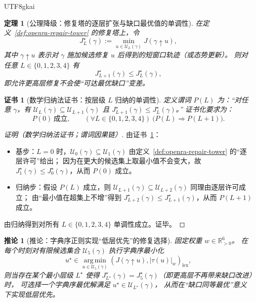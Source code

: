 \documentclass[12pt]{article}
\newtheorem{theorem}{定理}[section]
\newtheorem{corollary}{推论}[section]
\newtheorem{Certificate}{证书}[section]
\newcommand{\RR}{\mathbb{R}}
\begin{document}
\begin{CJK*}{UTF8}{gkai}
\begin{theorem}[公理降级：修复塔的逐层扩张与缺口最优值的单调性]
\label{thm:openra-repair-tower-monotone}
在定义~\ref{def:openra-repair-tower} 的修复塔上，令
\[
  J_L^\star(\gamma)
  :=
  \min_{u\in\mathcal{U}_L(\gamma)} J(\gamma\uparrow u),
\]
其中 $\gamma\uparrow u$ 表示对 $\gamma$ 施加候选修复 $u$ 后得到的短窗口轨迹（或态势更新）。
则对任意 $L\in\{0,1,2,3,4\}$ 有
\[
  J_{L+1}^\star(\gamma)\le J_L^\star(\gamma),
\]
即允许更高层修复不会使“可达最优缺口”变差。
\end{theorem}

\begin{Certificate}[数学归纳法证书：按层级 $L$ 归纳的单调性]
\label{cert:openra-repair-tower-monotone}
定义谓词 $P(L)$ 为：“对任意 $\gamma$，有 $\mathcal{U}_L(\gamma)\subseteq\mathcal{U}_{L+1}(\gamma)$ 且 $J_{L+1}^\star(\gamma)\le
  J_L^\star(\gamma)$。”
证书化要求为：
\[
  P(0)\ \text{成立},\qquad
  (\forall L\in\{0,1,2,3,4\})\ \bigl(P(L)\Rightarrow P(L+1)\bigr).
\]
\end{Certificate}

\begin{proof}[证明（数学归纳法证书；谓词因果链）]
由证书~\ref{cert:openra-repair-tower-monotone}：
\begin{itemize}
  \item 基步：$L=0$ 时，$\mathcal{U}_0(\gamma)\subseteq\mathcal{U}_1(\gamma)$ 由定义~\ref{def:openra-repair-tower} 的“逐层许可”给出；
  因为在更大的候选集上取最小值不会变大，故 $J_1^\star(\gamma)\le J_0^\star(\gamma)$，从而 $P(0)$ 成立。
  \item 归纳步：假设 $P(L)$ 成立，则 $\mathcal{U}_{L+1}(\gamma)\subseteq\mathcal{U}_{L+2}(\gamma)$ 同理由逐层许可成立；
  由“最小值在超集上不增”得到 $J_{L+2}^\star(\gamma)\le J_{L+1}^\star(\gamma)$，从而 $P(L+1)$ 成立。
\end{itemize}
由归纳得到对所有 $L\in\{0,1,2,3,4\}$ 单调性成立。证毕。
\end{proof}

\begin{corollary}[推论：字典序正则实现“低层优先”的修复选择]
\label{cor:openra-lexicographic-implies-low-level-first}
固定权重 $w\in\RR_{>0}^6$。
在每个时刻对有限候选集合 $\mathcal{U}_5(\gamma)$ 执行字典序最小化
\[
  u^\star \in \operatorname*{arg\,min}_{u\in\mathcal{U}_5(\gamma)} (J(\gamma\uparrow u),|\tau(u)|_w)_{\mathrm{lex}},
\]
则当存在某个最小层级 $L^\star$ 使得 $J_{L^\star}^\star(\gamma)=J_5^\star(\gamma)$（即更高层不再带来缺口改进）时，
可选择一个字典序最优解满足 $u^\star\in \mathcal{U}_{L^\star}(\gamma)$，
从而在“缺口同等最优”意义下实现低层优先。
\end{corollary}


\end{CJK*}
\end{document}
